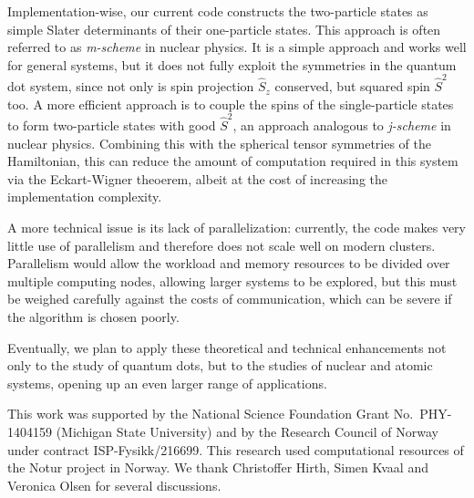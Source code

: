Implementation-wise, our current code constructs the two-particle states as simple Slater determinants of their one-particle states.  This approach is often referred to as \textit{m-scheme} in nuclear physics.  It is a simple approach and works well for general systems, but it does not fully exploit the symmetries in the quantum dot system, since not only is spin projection $\hat S_z$ conserved, but squared spin $\hat S^2$ too.  A more efficient approach is to couple the spins of the single-particle states to form two-particle states with good $\hat S^2$, an approach analogous to \textit{j-scheme} in nuclear physics.  Combining this with the spherical tensor symmetries of the Hamiltonian, this can reduce the amount of computation required in this system via the Eckart-Wigner theoerem, albeit at the cost of increasing the implementation complexity.

A more technical issue is its lack of parallelization: currently, the code makes very little use of parallelism and therefore does not scale well on modern clusters.  Parallelism would allow the workload and memory resources to be divided over multiple computing nodes, allowing larger systems to be explored, but this must be weighed carefully against the costs of communication, which can be severe if the algorithm is chosen poorly.

Eventually, we plan to apply these theoretical and technical enhancements not only to the study of quantum dots, but to the studies of nuclear and atomic systems, opening up an even larger range of applications.

\begin{acknowledgments}
  This work was supported by the National Science Foundation Grant No.~PHY-1404159 (Michigan State University) and by the Research Council of Norway under contract ISP-Fysikk/216699.  This research used computational resources of the Notur project in Norway.  We thank Christoffer Hirth, Simen Kvaal and Veronica Olsen for several discussions.
\end{acknowledgments}




